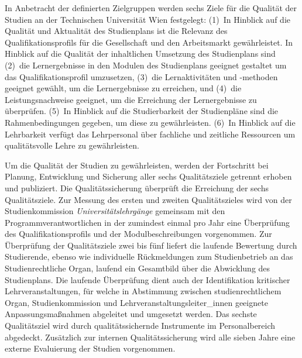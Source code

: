 In Anbetracht der definierten Zielgruppen werden sechs Ziele für die
Qualität der Studien an der Technischen Universität Wien festgelegt:
(1)~In Hinblick auf die Qualität und Aktualität des
Studienplans ist die Relevanz des Qualifikationsprofils für die
Gesellschaft und den Arbeitsmarkt gewährleistet. In Hinblick auf die
Qualität der inhaltlichen Umsetzung des Studienplans sind (2)~die
Lernergebnisse in den Modulen des Studienplans geeignet gestaltet um
das Qualifikationsprofil umzusetzen, (3)~die Lernaktivitäten und
-methoden geeignet gewählt, um die Lernergebnisse zu erreichen, und
(4)~die Leistungsnachweise geeignet, um die Erreichung der
Lernergebnisse zu überprüfen.  (5)~In Hinblick auf die Studierbarkeit
der Studienpläne sind die Rahmenbedingungen gegeben, um diese zu
gewährleisten.  (6)~In Hinblick auf die Lehrbarkeit verfügt das
Lehrpersonal über fachliche und zeitliche Ressourcen um qualitätsvolle
Lehre zu gewährleisten.
\medskip

Um die Qualität der Studien zu gewährleisten, werden der Fortschritt
bei Planung, Entwicklung und Sicherung aller sechs Qualitätsziele
getrennt erhoben und publiziert.  Die Qualitätssicherung überprüft die
Erreichung der sechs Qualitätsziele. Zur Messung des ersten und
zweiten Qualitätszieles wird von der Studienkommission 
\emph{Universitätslehrgänge} gemeinsam mit den 
Programmverantwortlichen in der  \emph{} 
zumindest einmal pro Jahr eine Überprüfung des Qualifikationsprofils 
und der Modulbeschreibungen vorgenommen. Zur Überprüfung der
Qualitätsziele zwei bis fünf liefert die laufende Bewertung durch
Studierende, ebenso wie individuelle Rückmeldungen zum Studienbetrieb
an das Studienrechtliche Organ, laufend ein Gesamtbild über die
Abwicklung des Studienplans. Die laufende Überprüfung dient auch der
Identifikation kritischer Lehrveranstaltungen, für welche in
Abstimmung zwischen stu\-dienrechtlichem Organ, Studienkommission und
Lehrveranstaltungsleiter\_innen geeignete Anpassungsmaßnahmen abgeleitet 
und umgesetzt werden. Das sechste Qualitätsziel wird durch qualitätssichernde 
Instrumente im Personalbereich abgedeckt. Zusätzlich zur internen 
Qualitätssicherung wird alle sieben Jahre eine externe Evaluierung der 
Studien vorgenommen.

%

